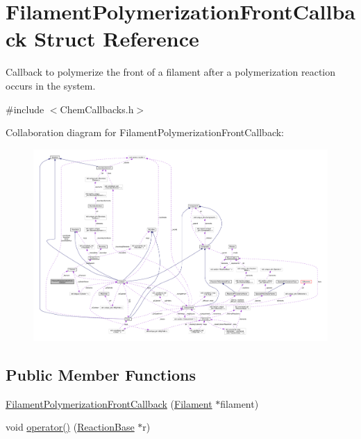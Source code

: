 \hypertarget{structFilamentPolymerizationFrontCallback}{\section{Filament\+Polymerization\+Front\+Callback Struct Reference}
\label{structFilamentPolymerizationFrontCallback}
}


Callback to polymerize the front of a filament after a polymerization reaction occurs in the system.  




{\ttfamily \#include $<$Chem\+Callbacks.\+h$>$}



Collaboration diagram for Filament\+Polymerization\+Front\+Callback\+:\nopagebreak
\begin{figure}[H]
\begin{center}
\leavevmode
\includegraphics[width=350pt]{structFilamentPolymerizationFrontCallback__coll__graph}
\end{center}
\end{figure}
\subsection*{Public Member Functions}
\begin{DoxyCompactItemize}
\item 
\hyperlink{structFilamentPolymerizationFrontCallback_aef1d6c929cc7e0e4c6da2cb55d086cc4}{Filament\+Polymerization\+Front\+Callback} (\hyperlink{classFilament}{Filament} $\ast$filament)
\item 
void \hyperlink{structFilamentPolymerizationFrontCallback_a70946cc065011fe2042a0d8e8d69ddfa}{operator()} (\hyperlink{classReactionBase}{Reaction\+Base} $\ast$r)
\end{DoxyCompactItemize}
